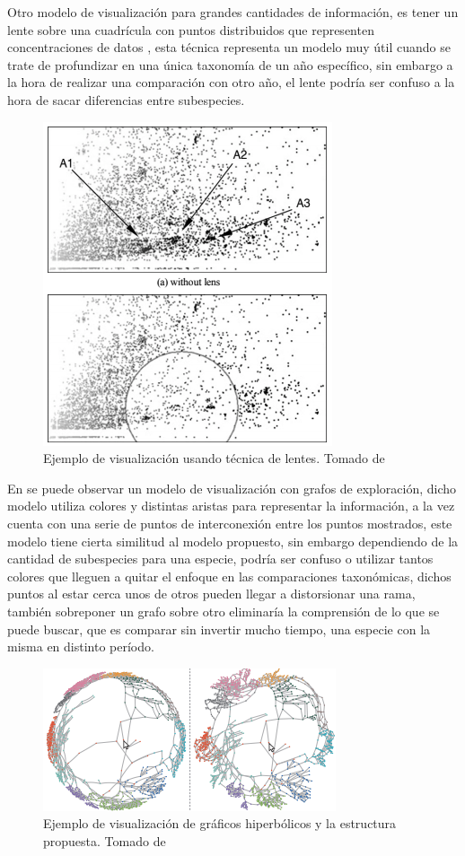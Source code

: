 \documentclass[journal]{IEEEtran}
\begin{document}
Otro modelo de visualización para grandes cantidades de información, es tener un lente sobre una cuadrícula con puntos distribuidos que representen concentraciones de datos \cite{lens-visual}, esta técnica representa un modelo muy útil cuando se trate de profundizar en una única taxonomía de un año específico, sin embargo a la hora de realizar una comparación con otro año, el lente podría ser confuso a la hora de sacar diferencias entre subespecies.
\begin{figure}[]
  \centering
  \includegraphics[scale=0.6]{plots-lens}
  \caption{Ejemplo de visualización usando técnica de lentes. Tomado  de \cite{lens-visual}}
\end{figure}

En \cite{graph-explore} se puede observar un modelo de visualización con grafos de exploración, dicho modelo utiliza colores y distintas aristas para representar la información, a la vez cuenta con una serie de puntos de interconexión entre los puntos mostrados, este modelo tiene cierta similitud al modelo propuesto, sin embargo dependiendo de la cantidad de subespecies para una especie, podría ser confuso o utilizar tantos colores que lleguen a quitar el enfoque en las comparaciones taxonómicas, dichos puntos al estar cerca unos de otros pueden llegar a distorsionar una rama, también sobreponer un grafo sobre otro eliminaría la comprensión de lo que se puede buscar, que es comparar sin invertir mucho tiempo, una especie con la misma en distinto período.
\begin{figure}[]
  \centering
  \includegraphics[scale=0.6]{graphs-exploration}
  \caption{Ejemplo de visualización de gráficos hiperbólicos y la estructura propuesta. Tomado de \cite{graph-explore}}
\end{figure}
\end{document}
